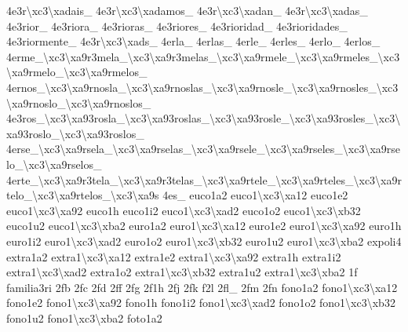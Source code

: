 {4e3r\textbackslash{}xc3\textbackslash{}xadais\-\_\- 4e3r\textbackslash{}xc3\textbackslash{}xadamos\-\_\- 4e3r\textbackslash{}xc3\textbackslash{}xadan\-\_\- 4e3r\textbackslash{}xc3\textbackslash{}xadas\-\_\- 4e3rior\-\_\- 4e3riora\-\_\- 4e3rioras\-\_\- 4e3riores\-\_\- 4e3rioridad\-\_\- 4e3rioridades\-\_\- 4e3riormente\-\_\- 4e3r\textbackslash{}xc3\textbackslash{}xads\-\_\- 4erla\-\_\- 4erlas\-\_\- 4erle\-\_\- 4erles\-\_\- 4erlo\-\_\- 4erlos\-\_\- 4erme\-\_\textbackslash{}xc3\textbackslash{}xa9r3mela\-\_\textbackslash{}xc3\textbackslash{}xa9r3melas\-\_\textbackslash{}xc3\textbackslash{}xa9rmele\-\_\textbackslash{}xc3\textbackslash{}xa9rmeles\-\_\textbackslash{}xc3\textbackslash{}xa9rmelo\-\_\textbackslash{}xc3\textbackslash{}xa9rmelos\-\_\- 4ernos\-\_\textbackslash{}xc3\textbackslash{}xa9rnosla\-\_\textbackslash{}xc3\textbackslash{}xa9rnoslas\-\_\textbackslash{}xc3\textbackslash{}xa9rnosle\-\_\textbackslash{}xc3\textbackslash{}xa9rnosles\-\_\textbackslash{}xc3\textbackslash{}xa9rnoslo\-\_\textbackslash{}xc3\textbackslash{}xa9rnoslos\-\_\- 4e3ros\-\_\textbackslash{}xc3\textbackslash{}xa93rosla\-\_\textbackslash{}xc3\textbackslash{}xa93roslas\-\_\textbackslash{}xc3\textbackslash{}xa93rosle\-\_\textbackslash{}xc3\textbackslash{}xa93rosles\-\_\textbackslash{}xc3\textbackslash{}xa93roslo\-\_\textbackslash{}xc3\textbackslash{}xa93roslos\-\_\- 4erse\-\_\textbackslash{}xc3\textbackslash{}xa9rsela\-\_\textbackslash{}xc3\textbackslash{}xa9rselas\-\_\textbackslash{}xc3\textbackslash{}xa9rsele\-\_\textbackslash{}xc3\textbackslash{}xa9rseles\-\_\textbackslash{}xc3\textbackslash{}xa9rselo\-\_\textbackslash{}xc3\textbackslash{}xa9rselos\-\_\- 4erte\-\_\textbackslash{}xc3\textbackslash{}xa9r3tela\-\_\textbackslash{}xc3\textbackslash{}xa9r3telas\-\_\textbackslash{}xc3\textbackslash{}xa9rtele\-\_\textbackslash{}xc3\textbackslash{}xa9rteles\-\_\textbackslash{}xc3\textbackslash{}xa9rtelo\-\_\textbackslash{}xc3\textbackslash{}xa9rtelos\-\_\textbackslash{}xc3\textbackslash{}xa9s 4es\-\_\- euco1a2 euco1\textbackslash{}xc3\textbackslash{}xa12 euco1e2 euco1\textbackslash{}xc3\textbackslash{}xa92 euco1h euco1i2 euco1\textbackslash{}xc3\textbackslash{}xad2 euco1o2 euco1\textbackslash{}xc3\textbackslash{}xb32 euco1u2 euco1\textbackslash{}xc3\textbackslash{}xba2 euro1a2 euro1\textbackslash{}xc3\textbackslash{}xa12 euro1e2 euro1\textbackslash{}xc3\textbackslash{}xa92 euro1h euro1i2 euro1\textbackslash{}xc3\textbackslash{}xad2 euro1o2 euro1\textbackslash{}xc3\textbackslash{}xb32 euro1u2 euro1\textbackslash{}xc3\textbackslash{}xba2 expoli4 extra1a2 extra1\textbackslash{}xc3\textbackslash{}xa12 extra1e2 extra1\textbackslash{}xc3\textbackslash{}xa92 extra1h extra1i2 extra1\textbackslash{}xc3\textbackslash{}xad2 extra1o2 extra1\textbackslash{}xc3\textbackslash{}xb32 extra1u2 extra1\textbackslash{}xc3\textbackslash{}xba2 1f familia3ri 2fb 2fc 2fd 2ff 2fg 2f1h 2fj 2fk f2l 2fl\-\_\- 2fm 2fn fono1a2 fono1\textbackslash{}xc3\textbackslash{}xa12 fono1e2 fono1\textbackslash{}xc3\textbackslash{}xa92 fono1h fono1i2 fono1\textbackslash{}xc3\textbackslash{}xad2 fono1o2 fono1\textbackslash{}xc3\textbackslash{}xb32 fono1u2 fono1\textbackslash{}xc3\textbackslash{}xba2 foto1a2 }
